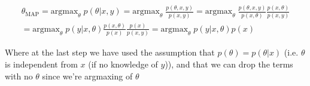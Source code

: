 %
%
\begin{answer}
\begin{align*}
\theta_{\text{MAP}} =
\text{argmax}_\theta\; p(\theta | x, y) =
\text{argmax}_\theta\; \frac{p(\theta, x, y)}{p(x, y)} =
\text{argmax}_\theta\; \frac{p(\theta, x, y)}{p(x, \theta)} \frac{p(x, \theta)}{p(x, y)}
\\
= \text{argmax}_\theta\; p(y | x, \theta) \frac{p(x, \theta)}{p(x)} \frac{p(x)}{p(x, y)} =
\text{argmax}_\theta\; p(y | x, \theta) p(x)
\end{align*}


Where at the last step we have used the assumption that $p(\theta) = p(\theta | x)$ (i.e. $\theta$ is independent from $x$ (if no knowledge of $y$)), and that we can drop the terms with no $\theta$ since we're argmaxing of $\theta$
\end{answer}
%
